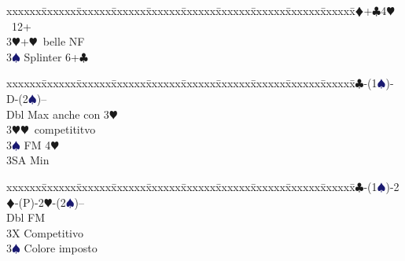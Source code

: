 \documentclass[a4paper,italian]{article}
\newcommand{\BC}{\textcolor{OliveGreen}{$\clubsuit$}}
\newcommand{\BD}{\textcolor{RedOrange}{$\vardiamondsuit$}}
\newcommand{\BH}{\textcolor{Red2}{$\varheartsuit${}}}
\newcommand{\BS}{\textcolor{MidnightBlue}{$\spadesuit${}}}
\newenvironment{bidtable}
{\begin{tabbing}

    xxxxxx\=xxxxxx\=xxxxxx\=xxxxxx\=xxxxxx\=xxxxxx\=xxxxxx\=xxxxxx\=xxxxxx\=xxxxxx\=\kill}
{\end{tabbing} }%
\newenvironment{sviluppi}
{\begin{tcolorbox}[colframe=azzurro,title=Sviluppi particolari]}
    {
\end{tcolorbox} }%
\begin{document}
\begin{multicols}{2}
\begin{bidtable}
                                            3\BD {}+\BC 4\BH\ 12+\\
                                            3\BH {}+\BH\ belle NF\\
                                            3\BS \> Splinter 6+\BC \-
                                        \end{bidtable}
                                        \begin{sviluppi}
                                            \begin{bidtable}
                                                1\BC-(1\BS)-D-(2\BS)--\+\\
                                                Dbl \> Max anche con 3\BH \\
                                                3\BH {}\BH\ competititvo\\
                                                3\BS \> FM 4\BH \+\\
                                                3SA \> Min\-\-
                                            \end{bidtable}
                                            \bigbreak
                                            \begin{bidtable}
                                                1\BC-(1\BS)-2\BD-(P)-2\BH-(2\BS)--\+\\
                                                Dbl \> FM\\
                                                3X \> Competitivo\\
                                                3\BS \> Colore imposto\-
                                            \end{bidtable}
                                        \end{sviluppi}


\end{multicols}
\end{document}
